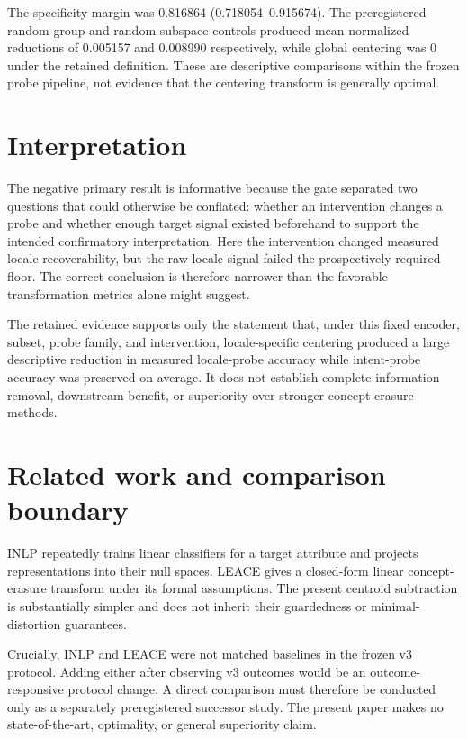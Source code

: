 \documentclass[10pt,twocolumn]{article}
\begin{document}
The specificity margin was 0.816864 (0.718054--0.915674). The preregistered random-group and random-subspace controls produced mean normalized reductions of 0.005157 and 0.008990 respectively, while global centering was 0 under the retained definition. These are descriptive comparisons within the frozen probe pipeline, not evidence that the centering transform is generally optimal.

\section{Interpretation}
The negative primary result is informative because the gate separated two questions that could otherwise be conflated: whether an intervention changes a probe and whether enough target signal existed beforehand to support the intended confirmatory interpretation. Here the intervention changed measured locale recoverability, but the raw locale signal failed the prospectively required floor. The correct conclusion is therefore narrower than the favorable transformation metrics alone might suggest.

The retained evidence supports only the statement that, under this fixed encoder, subset, probe family, and intervention, locale-specific centering produced a large descriptive reduction in measured locale-probe accuracy while intent-probe accuracy was preserved on average. It does not establish complete information removal, downstream benefit, or superiority over stronger concept-erasure methods.

\section{Related work and comparison boundary}
INLP \cite{ravfogel2020inlp} repeatedly trains linear classifiers for a target attribute and projects representations into their null spaces. LEACE \cite{belrose2023leace} gives a closed-form linear concept-erasure transform under its formal assumptions. The present centroid subtraction is substantially simpler and does not inherit their guardedness or minimal-distortion guarantees.

Crucially, INLP and LEACE were not matched baselines in the frozen v3 protocol. Adding either after observing v3 outcomes would be an outcome-responsive protocol change. A direct comparison must therefore be conducted only as a separately preregistered successor study. The present paper makes no state-of-the-art, optimality, or general superiority claim.
\end{document}
